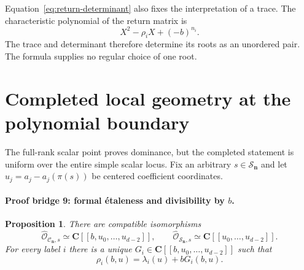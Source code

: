 \documentclass[11pt]{article}
\newtheorem{proposition}[theorem]{Proposition}
\theoremstyle{definition}
\theoremstyle{remark}
\newcommand{\C}{\mathbf C}
\newcommand{\cC}{\mathcal C}
\newcommand{\cS}{\mathcal S}
\newcommand{\bn}{\mathbf n}
\begin{document}
Equation~\eqref{eq:return-determinant} also fixes the interpretation of a
trace.  The characteristic polynomial of the return matrix is
\[
  X^2-\rho_iX+(-b)^{n_i}.
\]
The trace and determinant therefore determine its roots as an unordered
pair.  The formula supplies no regular choice of one root.

\section{Completed local geometry at the polynomial boundary}
\label{sec:completion}

The full-rank scalar point proves dominance, but the completed statement is
uniform over the entire simple scalar locus.  Fix an arbitrary
$s\in\cS_{\bn}$ and let
$u_j=a_j-a_j(\pi(s))$ be centered coefficient coordinates.

\paragraph{Proof bridge 9: formal étaleness and divisibility by $b$.}

\begin{proposition}
\label{prop:completion}
There are compatible isomorphisms
\[
  \widehat{\mathcal O}_{\cC_{\bn},s}
  \simeq
  \C[[b,u_0,\ldots,u_{d-2}]],
  \qquad
  \widehat{\mathcal O}_{\cS_{\bn},s}
  \simeq
  \C[[u_0,\ldots,u_{d-2}]].
\]
For every label $i$ there is a unique
$G_i\in\C[[b,u_0,\ldots,u_{d-2}]]$ such that
\[
  \rho_i(b,u)=\lambda_i(u)+bG_i(b,u).
\]
\end{proposition}
\end{document}
